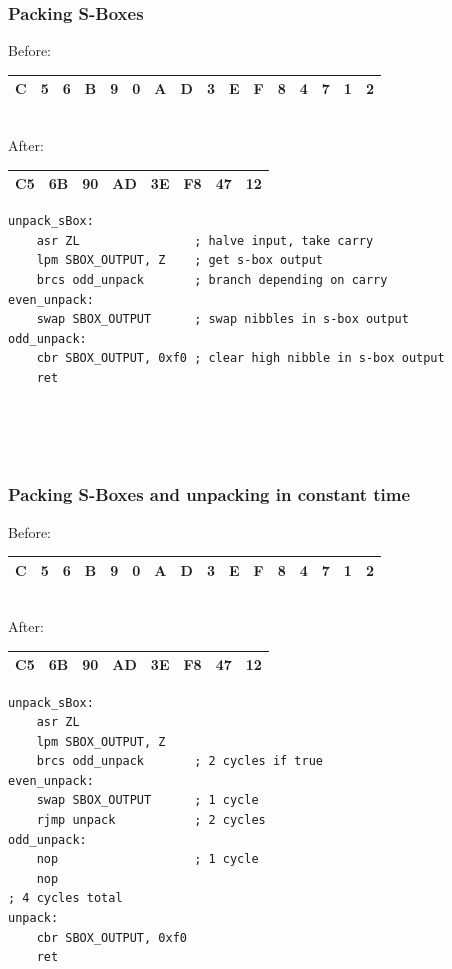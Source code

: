 \documentclass{beamer}
\begin{document}
\begin{frame}[fragile]
\frametitle{Packing S-Boxes}
	\footnotesize{
	Before: \\
	\begin{tabular}{ | c | c | c | c | c | c | c | c | c | c | c | c | c | c | c | c | }
	  \hline                        
	  C & 5 & 6 & B & 9 & 0 & A & D & 3 & E & F & 8 & 4 & 7 & 1 & 2 \\
	  \hline  
	\end{tabular}
	\\

	After: \\
	\begin{tabular}{ | c | c | c | c | c | c | c | c | }
	  \hline                        
	  C5 & 6B & 90 & AD & 3E & F8 & 47 & 12 \\
	  \hline  
	\end{tabular}
	}

\begin{lstlisting}
unpack_sBox:
    asr ZL                ; halve input, take carry
    lpm SBOX_OUTPUT, Z    ; get s-box output
    brcs odd_unpack       ; branch depending on carry
even_unpack:
    swap SBOX_OUTPUT      ; swap nibbles in s-box output
odd_unpack:
    cbr SBOX_OUTPUT, 0xf0 ; clear high nibble in s-box output
    ret
\end{lstlisting}
\begin{verbatim}




\end{verbatim}
\end{frame}

\begin{frame}[fragile]
\frametitle{Packing S-Boxes and unpacking in constant time}
	\footnotesize{
	Before: \\
	\begin{tabular}{ | c | c | c | c | c | c | c | c | c | c | c | c | c | c | c | c | }
	  \hline                        
	  C & 5 & 6 & B & 9 & 0 & A & D & 3 & E & F & 8 & 4 & 7 & 1 & 2 \\
	  \hline  
	\end{tabular}
	\\

	After: \\
	\begin{tabular}{ | c | c | c | c | c | c | c | c | }
	  \hline                        
	  C5 & 6B & 90 & AD & 3E & F8 & 47 & 12 \\
	  \hline  
	\end{tabular}
	}

\begin{lstlisting}
unpack_sBox:
    asr ZL
    lpm SBOX_OUTPUT, Z
    brcs odd_unpack       ; 2 cycles if true
even_unpack:
    swap SBOX_OUTPUT      ; 1 cycle
    rjmp unpack           ; 2 cycles
odd_unpack:
    nop                   ; 1 cycle
    nop
; 4 cycles total
unpack:
    cbr SBOX_OUTPUT, 0xf0
    ret
\end{lstlisting}
\end{frame}
\end{document}
